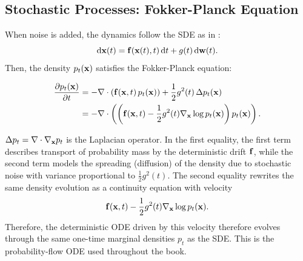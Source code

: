 



\subsection{Stochastic Processes: Fokker-Planck Equation}\label{subsec:cov-fpe}

When noise is added, the dynamics follow the SDE as in :
\[
\mathop{}\!\mathrm{d} {\mathbf{x}}(t) = {\mathbf{f}}({\mathbf{x}}(t), t)\mathop{}\!\mathrm{d} t + g(t)\mathop{}\!\mathrm{d} {\mathbf{w}}(t).
\]
Then, the density $ p_t({\mathbf{x}}) $ satisfies the Fokker-Planck equation:
\begin{mdframed}
    \begin{align*}
    \frac{\partial p_t({\mathbf{x}})}{\partial t}
&= - \nabla \cdot \left( {\mathbf{f}}({\mathbf{x}}, t)\, p_t({\mathbf{x}}) \right)
+ \frac{1}{2} g^2(t)\, \Delta p_t({\mathbf{x}})
\\& = - \nabla \cdot \left(  \left({{\mathbf{f}}({\mathbf{x}}, t)}-{\frac{1}{2} g^2(t) \nabla_{\mathbf{x}} \log p_t({\mathbf{x}})}\right) p_t({\mathbf{x}})\right).
\end{align*}
\end{mdframed}
$ \Delta p_t = \nabla \cdot \nabla_{\mathbf{x}} p_t $ is the Laplacian operator. In the first equality, the first term describes transport of probability mass by the deterministic drift ${\mathbf{f}}$, while the second term models the spreading (diffusion) of the density due to stochastic noise with variance proportional to $\tfrac{1}{2} g^2(t) $. The second equality rewrites the same density evolution as a continuity
equation with velocity
\[
{\mathbf{f}}({\mathbf{x}},t)
-
\frac{1}{2}g^2(t)\nabla_{{\mathbf{x}}}\log p_t({\mathbf{x}}).
\]
Therefore, the deterministic ODE driven by this
velocity therefore evolves through the same one-time marginal densities
$p_t$ as the SDE. This is the probability-flow ODE used throughout
the book.

